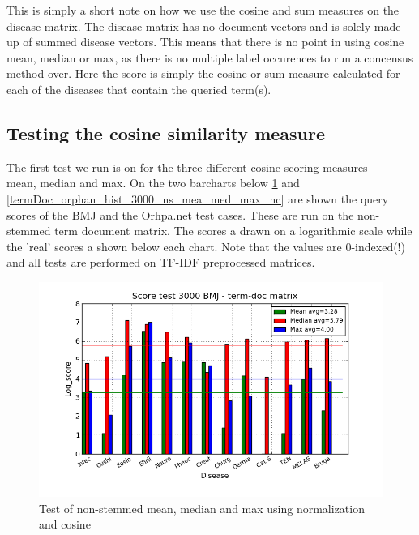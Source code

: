 This is simply a short note on how we use the cosine and sum measures
on the disease matrix. The disease matrix has no document vectors and
is solely made up of summed disease vectors. This means that there is
no point in using cosine mean, median or max, as there is no multiple
label occurences to run a concensus method over. Here the score is
simply the cosine or sum measure calculated for each of the diseases
that contain the queried term(s).

\subsection{Testing the cosine similarity measure\label{TestingCosineSimilarity}}

The first test we run is on for the three different cosine scoring measures --- mean, median and max. On the two barcharts below \ref{termDoc_bmj_hist_3000_ns_mea_med_max_nc} and \ref{termDoc_orphan_hist_3000_ns_mea_med_max_nc} are shown the query scores of the BMJ and the Orhpa.net test cases. These are run on the non-stemmed term document matrix. The scores a drawn on a logarithmic scale while the 'real' scores a shown below each chart. Note that the values are 0-indexed(!) and all tests are performed on TF-IDF preprocessed matrices. \\

\begin{figure}[H]
        \begin{center}
          \includegraphics[width=1.0\textwidth]{barcharts/termDoc_bmj_hist_3000_ns_mea_med_max_nc.png}
        \end{center}
        \caption{Test of non-stemmed mean, median and max using normalization and cosine}
        \label{termDoc_bmj_hist_3000_ns_mea_med_max_nc}
\end{figure}

